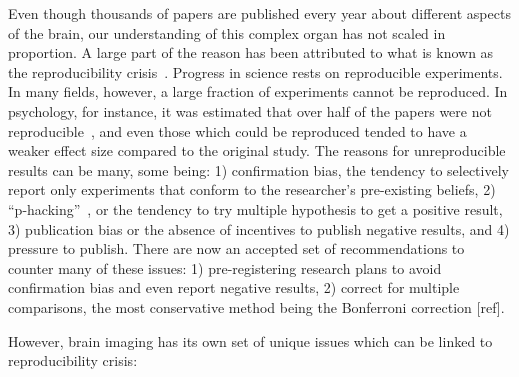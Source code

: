 Even though thousands of papers are published every year about different aspects of the brain, our understanding of this complex organ has not scaled in proportion. A large part of the reason has been attributed to what is known as the reproducibility crisis~\citep{ioannidis2005most, simmons2011false, button2013power}. %
Progress in science rests on reproducible experiments. In many fields, however, a large fraction of experiments cannot be reproduced. In psychology, for instance, it was estimated that over half of the papers were not reproducible~\citep{open2015estimating}, and even those which could be reproduced tended to have a weaker effect size compared to the original study. The reasons for unreproducible results can be many, some being: 1) confirmation bias, the tendency to selectively report only experiments that conform to the researcher's pre-existing beliefs, 2) ``p-hacking''~\citep{simmons2011false}, or the tendency to try multiple hypothesis to get a positive result, 3) publication bias or the absence of incentives to publish negative results, and 4) pressure to publish. There are now an accepted set of recommendations to counter many of these issues: 1) pre-registering research plans to avoid confirmation bias and even report negative results, 2) correct for multiple comparisons, the most conservative method being the Bonferroni correction [ref]. 

However, brain imaging has its own set of unique issues which can be linked to reproducibility crisis: 


